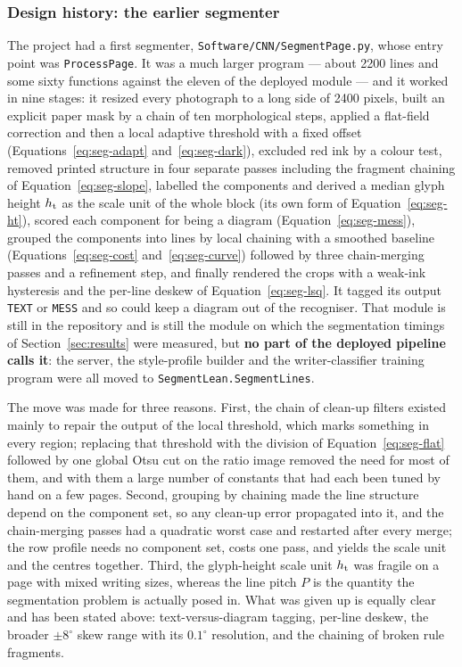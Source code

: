 \subsubsection{Design history: the earlier segmenter}

The project had a first segmenter, \texttt{Software/CNN/SegmentPage.py}, whose entry point was \texttt{ProcessPage}.
It was a much larger program --- about 2200 lines and some sixty functions against the eleven of the deployed module --- and it worked in nine stages: it resized every photograph to a long side of 2400 pixels, built an explicit paper mask by a chain of ten morphological steps, applied a flat-field correction and then a local adaptive threshold with a fixed offset (Equations~\ref{eq:seg-adapt} and~\ref{eq:seg-dark}), excluded red ink by a colour test, removed printed structure in four separate passes including the fragment chaining of Equation~\ref{eq:seg-slope}, labelled the components and derived a median glyph height $h_{\mathrm{t}}$ as the scale unit of the whole block (its own form of Equation~\ref{eq:seg-ht}), scored each component for being a diagram (Equation~\ref{eq:seg-mess}), grouped the components into lines by local chaining with a smoothed baseline (Equations~\ref{eq:seg-cost} and~\ref{eq:seg-curve}) followed by three chain-merging passes and a refinement step, and finally rendered the crops with a weak-ink hysteresis and the per-line deskew of Equation~\ref{eq:seg-lsq}.
It tagged its output \texttt{TEXT} or \texttt{MESS} and so could keep a diagram out of the recogniser.
That module is still in the repository and is still the module on which the segmentation timings of Section~\ref{sec:results} were measured, but \textbf{no part of the deployed pipeline calls it}: the server, the style-profile builder and the writer-classifier training program were all moved to \texttt{SegmentLean.SegmentLines}.

The move was made for three reasons.
First, the chain of clean-up filters existed mainly to repair the output of the local threshold, which marks something in every region; replacing that threshold with the division of Equation~\ref{eq:seg-flat} followed by one global Otsu cut on the ratio image removed the need for most of them, and with them a large number of constants that had each been tuned by hand on a few pages.
Second, grouping by chaining made the line structure depend on the component set, so any clean-up error propagated into it, and the chain-merging passes had a quadratic worst case and restarted after every merge; the row profile needs no component set, costs one pass, and yields the scale unit and the centres together.
Third, the glyph-height scale unit $h_{\mathrm{t}}$ was fragile on a page with mixed writing sizes, whereas the line pitch $P$ is the quantity the segmentation problem is actually posed in.
What was given up is equally clear and has been stated above: text-versus-diagram tagging, per-line deskew, the broader $\pm8^\circ$ skew range with its $0.1^\circ$ resolution, and the chaining of broken rule fragments.

